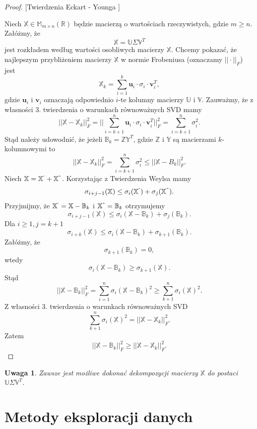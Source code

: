 \documentclass[12pt,a4paper]{report}
\newtheorem{uwaga}[df]{Uwaga}
\newcommand{\setR}{\mathbb{R}}
\begin{document}
\begin{proof}{[Twierdzenia Eckart - Younga {\citep[Tw. 4.21]{tsvdalra}}]} 

Niech $\mathbb{X} \in \mathbb{M}_{m\times n}(\setR)$ będzie macierzą o wartościach rzeczywistych, gdzie $m \geqslant n$.
Załóżmy, że
$$
\mathbb{X}=\mathbb{U} \Sigma \mathbb{V}^T
$$
jest rozkładem według wartości osobliwych macierzy $\mathbb{X}$.
Chcemy pokazać, że najlepszym przybliżeniem macierzy $\mathbb{X}$ w normie Frobeniusa (oznaczamy $||\cdot||_F$) jest
$$
\mathbb{X}_k = \sum_{i=1}^k \mathbf{u}_i\cdot \sigma_i \cdot \mathbf{v}_i^T,
$$
gdzie $\mathbf{u}_i$ i $\mathbf{v}_i$ oznaczają odpowiednio $i$-te kolumny macierzy $\mathbb{U}$ i $\mathbb{V}$.
Zauważmy, że z własności 3. twierdzenia o warunkach równoważnych SVD mamy
$$
||\mathbb{X} - \mathbb{X}_k||_F^2 = ||\sum_{i=k+1}^n \mathbf{u}_i \cdot \sigma_i \cdot \mathbf{v}_i^T||_F^2 = \sum_{i=k+1}^n \sigma_i^2.
$$
Stąd należy udowodnić, że jeżeli $\mathbb{B}_k = \mathbb{Z}\mathbb{Y}^T$, gdzie $\mathbb{Z}$ i $\mathbb{Y}$ są macierzami $k$-kolumnowymi to
$$
||\mathbb{X} - \mathbb{X}_k||_F^2 = \sum_{i=k+1}^n \sigma_i^2 \leqslant ||\mathbb{X} - B_k||_F^2.
$$
Niech $\mathbb{X} = \mathbb{X}^{`} + \mathbb{X}^{``}$. Korzystając z Twierdzenia Weylsa mamy
$$
\sigma_{i+j-1}(\mathbb{X})\leq \sigma_{i}(\mathbb{X}^{`}) + \sigma_j(\mathbb{X}^{``}).
$$ 
Przyjmijmy, że $\mathbb{X}^{`} = \mathbb{X} - \mathbb{B}_k$ i $\mathbb{X}^{``} = \mathbb{B}_k$ otrzymujemy
$$
\sigma_{i+j-1}(\mathbb{X})\leq \sigma_{i}(\mathbb{X} - \mathbb{B}_k) + \sigma_j(\mathbb{B}_k).
$$ 
Dla $i\geq 1, j= k+1$
$$
\sigma_{i+k}(\mathbb{X})\leq \sigma_{i}(\mathbb{X} - \mathbb{B}_k) + \sigma_{k+1}(\mathbb{B}_k).
$$ 
Załóżmy, że
$$
\sigma_{k+1}(\mathbb{B}_k)=0,
$$
wtedy
$$
\sigma_i(\mathbb{X}-\mathbb{B}_k)\geq \sigma_{k+1}(\mathbb{X}).
$$
Stąd
$$
||\mathbb{X} - \mathbb{B}_k||_F^2 = \sum_{i=1}^n \sigma_i(\mathbb{X}-\mathbb{B}_k)^2\geq \sum_{k+1}^n \sigma_i(\mathbb{X})^2.
$$
Z własności 3. twierdzenia o warunkach równoważnych SVD
$$
\sum_{k+1}^n \sigma_i(\mathbb{X})^2 = ||\mathbb{X}-\mathbb{X}_k||_F^2.
$$
Zatem
$$
||\mathbb{X} - \mathbb{B}_k||_F^2 \geqslant ||\mathbb{X}-\mathbb{X}_k||_F^2.
$$
\end{proof}

\begin{uwaga}
Zawsze jest możliwe dokonać dekompozycji macierzy $\mathbb{X}$ do postaci $\mathbb{U} \Sigma \mathbb{V}^T$.
\end{uwaga}

\section{Metody eksploracji danych}
\end{document}
